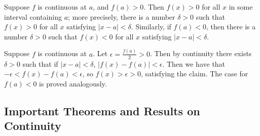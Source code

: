 \documentclass[12pt]{report}
\begin{document}
\begin{thm}{}{}
    Suppose $f$ is continuous at $a$, and $f(a) > 0$. Then $f(x) > 0$ for all $x$ in some interval containing $a$; more precisely, there is a number $\delta > 0$ such that $f(x) > 0$ for all $x$ satisfying $|x-a| < \delta$. Similarly, if $f(a) < 0$, then there is a number $\delta > 0$ such that $f(x) < 0$ for all $x$ satisfying $|x-a| < \delta$.
\end{thm}
\begin{proof*}{}{}
    Suppose $f$ is continuous at $a$. Let $\epsilon = \frac{f(a)}{2} > 0$. Then by continuity there exists $\delta > 0$ such that if $|x-a| < \delta$, $|f(x) - f(a)| < \epsilon$. Then we have that $-\epsilon < f(x) - f(a) < \epsilon$, so $f(x) > \epsilon > 0$, satisfying the claim. The case for $f(a) < 0$ is proved analogously.
\end{proof*}


\subsection{Important Theorems and Results on Continuity}
\end{document}
